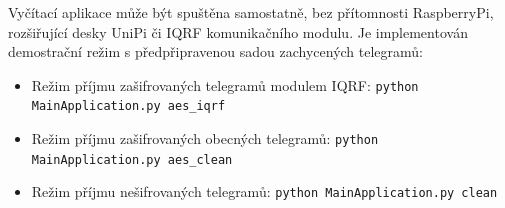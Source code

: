 	\vspace{10pt}
Vyčítací aplikace může být spuštěna samostatně, bez přítomnosti RaspberryPi, rozšiřující desky UniPi či IQRF komunikačního modulu. Je implementován demostrační režim s předpřipravenou sadou zachycených telegramů:
\begin{itemize}
	\item Režim příjmu zašifrovaných telegramů modulem IQRF: 
		\newline 
		\texttt{python MainApplication.py aes\_iqrf}
	\item Režim příjmu zašifrovaných obecných telegramů: 
		\newline 
		\texttt{python MainApplication.py aes\_clean}
	\item Režim příjmu nešifrovaných telegramů: 
		\newline 
		\texttt{python MainApplication.py clean}
\end{itemize}


